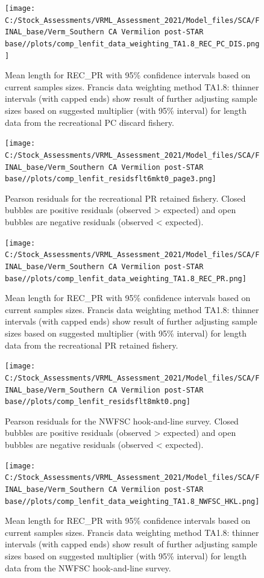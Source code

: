 \documentclass[
  english,
  a4paper,
]{article}
\begin{document}
\begin{figure}
\centering
\texttt{[image: C:/Stock\_Assessments/VRML\_Assessment\_2021/Model\_files/SCA/FINAL\_base/Verm\_Southern CA Vermilion post-STAR base//plots/comp\_lenfit\_data\_weighting\_TA1.8\_REC\_PC\_DIS.png]}
\caption{Mean length for REC\_PR with 95\% confidence intervals based on current samples sizes. Francis data weighting method TA1.8: thinner intervals (with capped ends) show result of further adjusting sample sizes based on suggested multiplier (with 95\% interval) for length data from the recreational PC discard fishery.\label{fig:mean-len-fit-REC-PC-DIS}}
\end{figure}

\begin{figure}
\centering
\texttt{[image: C:/Stock\_Assessments/VRML\_Assessment\_2021/Model\_files/SCA/FINAL\_base/Verm\_Southern CA Vermilion post-STAR base//plots/comp\_lenfit\_residsflt6mkt0\_page3.png]}
\caption{Pearson residuals for the recreational PR retained fishery. Closed bubbles are positive residuals (observed \textgreater{} expected) and open bubbles are negative residuals (observed \textless{} expected).\label{fig:len-pearson-REC-PR}}
\end{figure}

\begin{figure}
\centering
\texttt{[image: C:/Stock\_Assessments/VRML\_Assessment\_2021/Model\_files/SCA/FINAL\_base/Verm\_Southern CA Vermilion post-STAR base//plots/comp\_lenfit\_data\_weighting\_TA1.8\_REC\_PR.png]}
\caption{Mean length for REC\_PR with 95\% confidence intervals based on current samples sizes. Francis data weighting method TA1.8: thinner intervals (with capped ends) show result of further adjusting sample sizes based on suggested multiplier (with 95\% interval) for length data from the recreational PR retained fishery.\label{fig:mean-len-fit-REC-PR}}
\end{figure}

\begin{figure}
\centering
\texttt{[image: C:/Stock\_Assessments/VRML\_Assessment\_2021/Model\_files/SCA/FINAL\_base/Verm\_Southern CA Vermilion post-STAR base//plots/comp\_lenfit\_residsflt8mkt0.png]}
\caption{Pearson residuals for the NWFSC hook-and-line survey. Closed bubbles are positive residuals (observed \textgreater{} expected) and open bubbles are negative residuals (observed \textless{} expected).\label{fig:len-pearson-NWFSC-HKL}}
\end{figure}

\begin{figure}
\centering
\texttt{[image: C:/Stock\_Assessments/VRML\_Assessment\_2021/Model\_files/SCA/FINAL\_base/Verm\_Southern CA Vermilion post-STAR base//plots/comp\_lenfit\_data\_weighting\_TA1.8\_NWFSC\_HKL.png]}
\caption{Mean length for REC\_PR with 95\% confidence intervals based on current samples sizes. Francis data weighting method TA1.8: thinner intervals (with capped ends) show result of further adjusting sample sizes based on suggested multiplier (with 95\% interval) for length data from the NWFSC hook-and-line survey.\label{fig:mean-len-fit-NWFSC-HKL}}
\end{figure}
\end{document}

